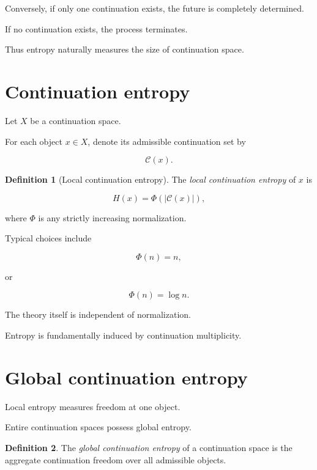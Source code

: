 \documentclass[13pt,openany]{book}
\theoremstyle{plain}
\theoremstyle{definition}
\newtheorem{definition}{Definition}[chapter]
\begin{document}
Conversely, if only one continuation exists, the future is completely determined.

If no continuation exists, the process terminates.

Thus entropy naturally measures the size of continuation space.

\section{Continuation entropy}

Let $X$ be a continuation space.

For each object $x\in X$, denote its admissible continuation set by

\[
\mathcal C(x).
\]

\begin{definition}[Local continuation entropy]

The \emph{local continuation entropy} of $x$ is

\[
H(x)
=
\Phi(|\mathcal C(x)|),
\]

where $\Phi$ is any strictly increasing normalization.

\end{definition}

Typical choices include

\[
\Phi(n)=n,
\]

or

\[
\Phi(n)=\log n.
\]

The theory itself is independent of normalization.

Entropy is fundamentally induced by continuation multiplicity.

\section{Global continuation entropy}

Local entropy measures freedom at one object.

Entire continuation spaces possess global entropy.

\begin{definition}

The \emph{global continuation entropy} of a continuation space is the aggregate continuation freedom over all admissible objects.

\end{definition}
\end{document}
